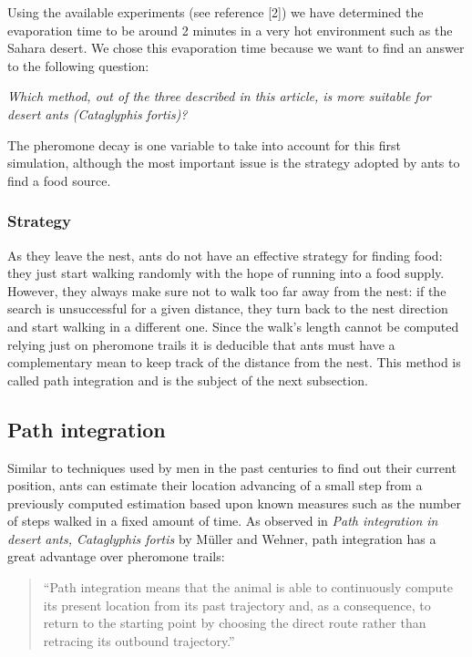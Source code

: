 \documentclass[11pt]{article}
\begin{document}
Using the available experiments (see reference [2]) we have determined the evaporation time to be around 2 minutes in a very hot environment such as the Sahara desert. We chose this evaporation time because we want to find an answer to the following question:
\begin{center}
\emph{Which method, out of the three described in this article, is more suitable for desert ants (Cataglyphis fortis)?}
\end{center}

The pheromone decay is one variable to take into account for this first simulation, although the most important issue is the strategy adopted by ants to find a food source.

\subsubsection{Strategy}
As they leave the nest, ants do not have an effective strategy for finding food: they just start walking randomly with the hope of running into a food supply. However, they always make sure not to walk too far away from the nest: if the search is unsuccessful for a given distance, they turn back to the nest direction and start walking in a different one. Since the walk's length cannot be computed relying just on pheromone trails it is deducible that ants must have a complementary mean to keep track of the distance from the nest. This method is called path integration and is the subject of the next subsection.

\subsection{Path integration}

Similar to techniques used by men in the past centuries to find out their current position, ants can estimate their location advancing of a small step from a previously computed estimation based upon known measures such as the number of steps walked in a fixed amount of time. As observed in \emph{Path integration in desert ants, Cataglyphis fortis} by M\"{u}ller and Wehner, path integration has a great advantage over pheromone trails:
\begin{center}
	\begin{quotation}
		``Path integration means that the animal is able to continuously compute its present location from its past trajectory and, as
		a consequence, to return to the starting point by choosing the direct route rather than retracing its outbound trajectory.''
	\end{quotation}
\end{center}
\end{document}
